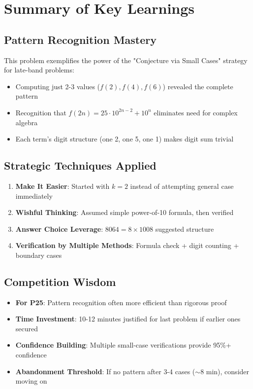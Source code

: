 \documentclass[]{article}
\begin{document}
\section*{Summary of Key Learnings}

\subsection*{Pattern Recognition Mastery}
This problem exemplifies the power of the "Conjecture via Small Cases" strategy for late-band problems:
\begin{itemize}[leftmargin=*]
    \item Computing just 2-3 values ($f(2), f(4), f(6)$) revealed the complete pattern
    \item Recognition that $f(2n) = 25 \cdot 10^{2n-2} + 10^n$ eliminates need for complex algebra
    \item Each term's digit structure (one 2, one 5, one 1) makes digit sum trivial
\end{itemize}

\subsection*{Strategic Techniques Applied}
\begin{enumerate}[leftmargin=*]
    \item \textbf{Make It Easier}: Started with $k=2$ instead of attempting general case immediately
    \item \textbf{Wishful Thinking}: Assumed simple power-of-10 formula, then verified
    \item \textbf{Answer Choice Leverage}: $8064 = 8 \times 1008$ suggested structure
    \item \textbf{Verification by Multiple Methods}: Formula check + digit counting + boundary cases
\end{enumerate}

\subsection*{Competition Wisdom}
\begin{itemize}[leftmargin=*]
    \item \textbf{For P25}: Pattern recognition often more efficient than rigorous proof
    \item \textbf{Time Investment}: 10-12 minutes justified for last problem if earlier ones secured
    \item \textbf{Confidence Building}: Multiple small-case verifications provide 95\%+ confidence
    \item \textbf{Abandonment Threshold}: If no pattern after 3-4 cases ($\sim$8 min), consider moving on
\end{itemize}
\end{document}
